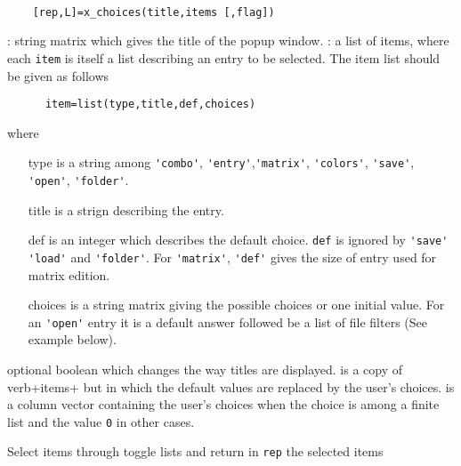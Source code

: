 \begin{mandesc}
  \\ %
\end{mandesc}
\begin{calling_sequence}
  \begin{verbatim}
    [rep,L]=x_choices(title,items [,flag])   
  \end{verbatim}
\end{calling_sequence}
\begin{parameters}
  \begin{varlist}
    : string matrix which gives the title of the popup window.
    : a list of items, where each \verb!item! is itself a list 
    describing an entry to be selected. The item list should be given as follows 
    \begin{verbatim}
      item=list(type,title,def,choices) 
    \end{verbatim} 
    where 
    \begin{itemize}
      \item[type] is a string among \verb+'combo'+, \verb+'entry'+,\verb+'matrix'+, 
      \verb+'colors'+, \verb+'save'+, \verb+'open'+, \verb+'folder'+. 
    \item[title] is a strign describing the entry. 
    \item[def] is an integer which describes the default choice. \verb+def+ is ignored by \verb+'save'+ 
      \verb+'load'+ and \verb+'folder'+. For \verb+'matrix'+, \verb+'def'+ gives the size of entry used for 
      matrix edition.
    \item[choices] is a string matrix giving the possible choices or one initial value. For an 
      \verb+'open'+ entry it is a default answer followed be a list of file filters (See example below).
    \end{itemize}
     optional boolean which changes the way titles are displayed. 
     is a copy of verb+items+ but in which the default values are replaced by the user's choices. 
     is a column vector containing the user's choices when the choice is among a finite list and 
    the value \verb+0+ in other cases.
  \end{varlist}
\end{parameters}
\begin{mandescription}
  Select items through toggle lists and return in \verb!rep! the selected items
\end{mandescription}
